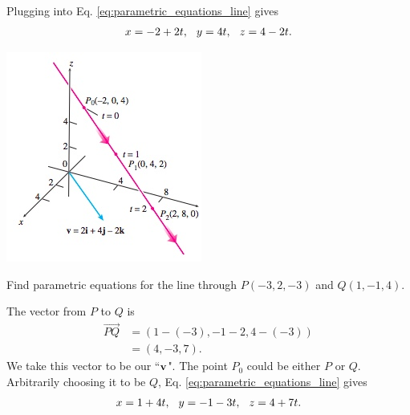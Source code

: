 \documentclass[12pt,letterpaper,reqno]{article}
\numberwithin{equation}{section}
\begin{document}
{\color{red} 
Plugging into Eq. \eqref{eq:parametric_equations_line} gives
\begin{align*}
	x=-2+2t, \hspace{0.25cm} y=4t, \hspace{0.25cm} z=4-2t.
\end{align*}}
\begin{center}
	\includegraphics[scale=0.5]{figures_mvc/parametrized_line_example_1}
\end{center}

\begin{example}
	Find parametric equations for the line through $P(-3,2,-3)$ and $Q(1,-1,4)$.
\end{example}

{\color{red} 
The vector from $P$ to $Q$ is 
\begin{align*}
	\overrightarrow{PQ}&=(1-(-3), -1-2, 4-(-3)) \\
	&=(4,-3,7).
\end{align*}
We take this vector to be our ``${\bf v}$". The point $P_0$ could be either $P$ or $Q$. Arbitrarily choosing it to be $Q$, Eq. \eqref{eq:parametric_equations_line} gives
\begin{align*}
	x=1+4t, \hspace{0.25cm} y=-1-3t, \hspace{0.25cm} z=4+7t.
\end{align*}}
\end{document}
